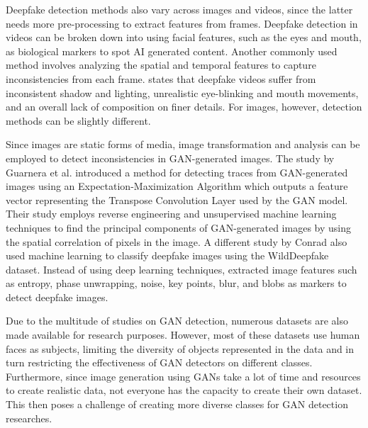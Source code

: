 \documentclass[journal]{./IEEE/IEEEtran}
\begin{document}
\par Deepfake detection methods also vary across images and videos, since the latter needs more pre-processing to extract features from frames. Deepfake detection in videos can be broken down into using facial features, such as the eyes and mouth, as biological markers to spot AI generated content. Another commonly used method involves analyzing the spatial and temporal features to capture inconsistencies from each frame. \cite{detect-deepfake} states that deepfake videos suffer from inconsistent shadow and lighting, unrealistic eye-blinking and mouth movements, and an overall lack of composition on finer details. For images, however, detection methods can be slightly different.

\par Since images are static forms of media, image transformation and analysis can be employed to detect inconsistencies in GAN-generated images. The study by Guarnera et al. \cite{deepfake-em} introduced a method for detecting traces from GAN-generated images using an Expectation-Maximization Algorithm which outputs a feature vector representing the Transpose Convolution Layer used by the GAN model. Their study employs reverse engineering and unsupervised machine learning techniques to find the principal components of GAN-generated images by using the spatial correlation of pixels in the image. A different study by Conrad \cite{ml-conrad} also used machine learning to classify deepfake images using the WildDeepfake dataset. Instead of using deep learning techniques, \cite{ml-conrad} extracted image features such as entropy, phase unwrapping, noise, key points, blur, and blobs as markers to detect deepfake images.  

\par Due to the multitude of studies on GAN detection, numerous datasets are also made available for research purposes. However, most of these datasets use human faces as subjects, limiting the diversity of objects represented in the data and in turn restricting the effectiveness of GAN detectors on different classes. Furthermore, since image generation using GANs take a lot of time and resources to create realistic data, not everyone has the capacity to create their own dataset. This then poses a challenge of creating more diverse classes for GAN detection researches.
\end{document}

